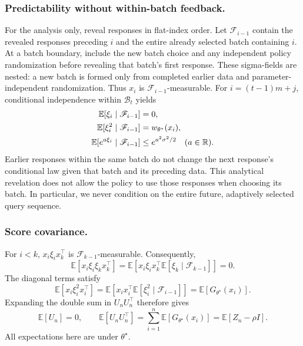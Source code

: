\documentclass[10pt,twoside,letterpaper]{article}
\newcommand{\R}{\mathbb R}
\newcommand{\E}{\mathbb E}
\begin{document}
\subsubsection*{Predictability without within-batch feedback.}
For the analysis only, reveal responses in flat-index order. Let
$\mathscr F_{i-1}$ contain the revealed responses preceding $i$ and
the entire already selected batch containing $i$. At a batch boundary,
include the new batch choice and any independent policy randomization
before revealing that batch's first response. These sigma-fields are
nested: a new batch is formed only from completed earlier data and
parameter-independent randomization. Thus $x_i$ is
$\mathscr F_{i-1}$-measurable. For $i=(t-1)m+j$, conditional
independence within $\mathcal B_t$ yields
\begin{align}
\E[\xi_i\mid\mathscr F_{i-1}]&=0,\notag\\
\E[\xi_i^2\mid\mathscr F_{i-1}]&=w_{\theta^\star}(x_i),\notag\\
\E[e^{a\xi_i}\mid\mathscr F_{i-1}]&\le e^{a^2\sigma^2/2}
\quad(a\in\R).
\label{eq:app-predictable-noise}
\end{align}
Earlier responses within the same batch do not change the next
response's conditional law given that batch and its preceding data.
This analytical revelation does not allow the policy to use those
responses when choosing its batch. In particular, we never condition
on the entire future, adaptively selected query sequence.

\subsubsection*{Score covariance.}
For $i<k$, $x_i\xi_i x_k^\top$ is
$\mathscr F_{k-1}$-measurable. Consequently,
\begin{equation}
\E[x_i\xi_i\xi_kx_k^\top]
=\E\!\left[x_i\xi_i x_k^\top
\E[\xi_k\mid\mathscr F_{k-1}]\right]=0.
\label{eq:app-cross-score-zero}
\end{equation}
The diagonal terms satisfy
\begin{equation}
\E[x_i\xi_i^2x_i^\top]
=\E[x_ix_i^\top\E[\xi_i^2\mid\mathscr F_{i-1}]]
=\E[G_{\theta^\star}(x_i)].
\label{eq:app-diagonal-score}
\end{equation}
Expanding the double sum in $U_nU_n^\top$ therefore gives
\begin{equation}
\E[U_n]=0,\qquad
\E[U_nU_n^\top]=\sum_{i=1}^n\E[G_{\theta^\star}(x_i)]
=\E[Z_n-\rho I].
\label{eq:app-score-cov}
\end{equation}
All expectations here are under $\theta^\star$.
\end{document}
